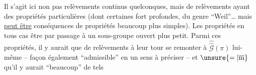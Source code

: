 Il s'agit ici non pas  relèvements continus quelconques, mais de relèvements ayant des propriétés particulières (dont certaines fort profondes, du genre ``Weil''\ldots\deleted{)} mais \uline{peut être} conséquences de propriétés beaucoup plus simples). Les propriétés   en tous cas être   par passage à un sous-groupe ouvert plus petit. Parmi ces propriétés, il y aurait que   de relèvements  à leur tour se remonter à $\widehat{\widehat{\mathcal G}}(\pi)$ lui-même --  façon également ``admissible'' en un sens à préciser -- et $\unsure{=|\overline{\mathrm m}}$ qu'il y aurait ``beaucoup''  de tels
